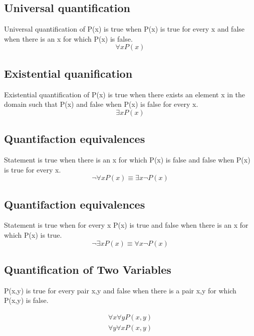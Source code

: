 \documentclass[12pt]{article}
\begin{document}
\subsection{Universal quantification}
Universal quantification of P(x)
is true
when
P(x) is true for every x
and false
when
there is an x for which P(x) is false.
\begin{equation}
\forall x P(x)
\end{equation}


\subsection{Existential quanification}
Existential quantification of P(x)
is true
when
there exists an element x in the domain such that P(x)
and false
when
P(x) is false for every x.
\begin{equation}
\exists x P(x)
\end{equation}


\subsection{Quantifaction equivalences}
Statement is true
when
there is an x for which P(x) is false
and
false 
when
P(x) is true for every x.
\begin{equation}
\neg \forall x P(x)\equiv\exists x \neg P(x)
\end{equation}


\subsection{Quantifaction equivalences}
Statement is true
when
for every x P(x) is true
and
false 
when 
there is an x for which P(x) is true.
\begin{equation}
\neg \exists x P(x)\equiv\forall x \neg P(x)
\end{equation}

\subsection{Quantification of Two Variables}
P(x,y)
is true
for every pair x,y
and
false
when there is a pair x,y for which P(x,y) is false.

\begin{subequations}\label{quan}
\begin{align}
\forall x \forall y P(x,y)\label{quan_first}\\
\forall y \forall x P(x,y)\label{quan_second}
\end{align}
\end{subequations}
\end{document}
